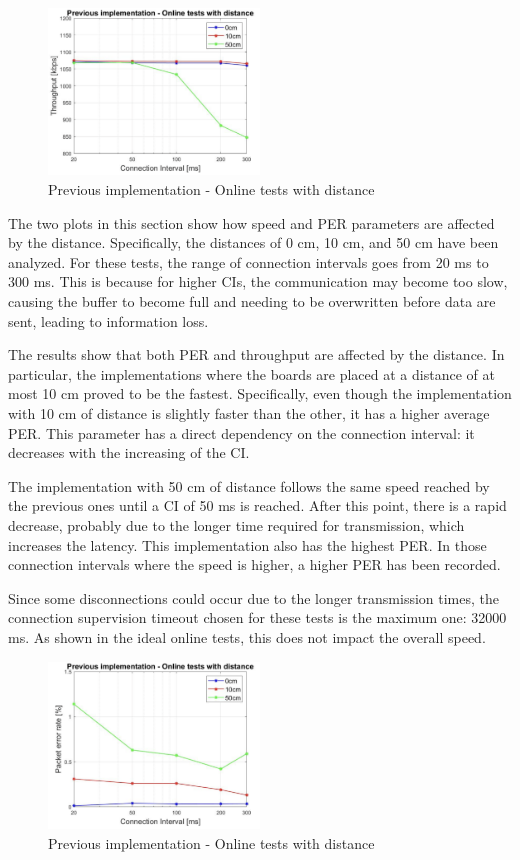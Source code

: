 \documentclass{Configuration_Files/PoliMi3i_thesis}
\begin{document}
\begin{figure}[H]
    \centering
    \includegraphics[width=0.5\textwidth]{Results Manuel/figure4}
    \caption{Previous implementation - Online tests with distance}
    \label{manuel_results_4}
\end{figure}

The two plots in this section show how speed and PER parameters are affected by the distance. Specifically, the distances of 0 cm, 10 cm, and 50 cm have been analyzed. For these tests, the range of connection intervals goes from 20 ms to 300 ms. This is because for higher CIs, the communication may become too slow, causing the buffer to become full and needing to be overwritten before data are sent, leading to information loss.

The results show that both PER and throughput are affected by the distance. In particular, the implementations where the boards are placed at a distance of at most 10 cm proved to be the fastest. Specifically, even though the implementation with 10 cm of distance is slightly faster than the other, it has a higher average PER. This parameter has a direct dependency on the connection interval: it decreases with the increasing of the CI.

The implementation with 50 cm of distance follows the same speed reached by the previous ones until a CI of 50 ms is reached. After this point, there is a rapid decrease, probably due to the longer time required for transmission, which increases the latency. This implementation also has the highest PER. In those connection intervals where the speed is higher, a higher PER has been recorded.

Since some disconnections could occur due to the longer transmission times, the connection supervision timeout chosen for these tests is the maximum one: 32000 ms. As shown in the ideal online tests, this does not impact the overall speed.

\begin{figure}[H]
    \centering
    \includegraphics[width=0.5\textwidth]{Results Manuel/figure5}
    \caption{Previous implementation - Online tests with distance}
    \label{manuel_results_5}
\end{figure}
\end{document}

